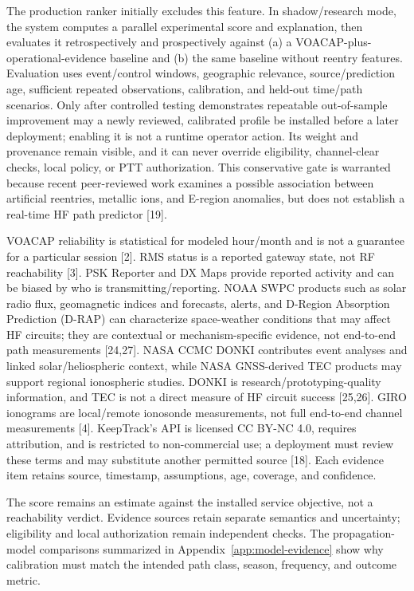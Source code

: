 \documentclass[11pt,a4paper]{article}
\begin{document}
The production ranker initially excludes this feature. In shadow/research mode, the system computes a parallel experimental score and explanation, then evaluates it retrospectively and prospectively against (a) a VOACAP-plus-operational-evidence baseline and (b) the same baseline without reentry features. Evaluation uses event/control windows, geographic relevance, source/prediction age, sufficient repeated observations, calibration, and held-out time/path scenarios. Only after controlled testing demonstrates repeatable out-of-sample improvement may a newly reviewed, calibrated profile be installed before a later deployment; enabling it is not a runtime operator action. Its weight and provenance remain visible, and it can never override eligibility, channel-clear checks, local policy, or PTT authorization. This conservative gate is warranted because recent peer-reviewed work examines a possible association between artificial reentries, metallic ions, and E-region anomalies, but does not establish a real-time HF path predictor [19].

VOACAP reliability is statistical for modeled hour/month and is not a guarantee for a particular session [2]. RMS status is a reported gateway state, not RF reachability [3]. PSK Reporter and DX Maps provide reported activity and can be biased by who is transmitting/reporting. NOAA SWPC products such as solar radio flux, geomagnetic indices and forecasts, alerts, and D-Region Absorption Prediction (D-RAP) can characterize space-weather conditions that may affect HF circuits; they are contextual or mechanism-specific evidence, not end-to-end path measurements [24,27]. NASA CCMC DONKI contributes event analyses and linked solar/heliospheric context, while NASA GNSS-derived TEC products may support regional ionospheric studies. DONKI is research/prototyping-quality information, and TEC is not a direct measure of HF circuit success [25,26]. GIRO ionograms are local/remote ionosonde measurements, not full end-to-end channel measurements [4]. KeepTrack's API is licensed CC BY-NC 4.0, requires attribution, and is restricted to non-commercial use; a deployment must review these terms and may substitute another permitted source [18]. Each evidence item retains source, timestamp, assumptions, age, coverage, and confidence.

The score remains an estimate against the installed service objective, not a
reachability verdict. Evidence sources retain separate semantics and
uncertainty; eligibility and local authorization remain independent checks.
The propagation-model comparisons summarized in Appendix~\ref{app:model-evidence}
show why calibration must match the intended path class, season, frequency,
and outcome metric.
\end{document}
